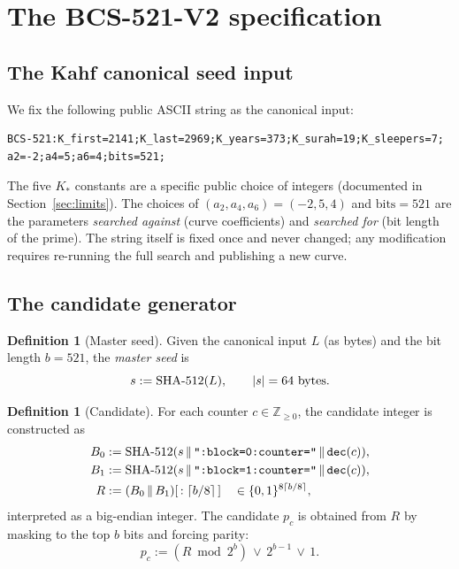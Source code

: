 \documentclass[11pt,a4paper]{article}
\theoremstyle{plain}
\theoremstyle{definition}
\newtheorem{definition}[theorem]{Definition}
\newcommand{\Z}{\mathbb{Z}}
\newcommand{\BCSV}{\textsf{BCS\hbox{-}521\hbox{-}V2}}
\begin{document}
\section{The \BCSV{} specification}
\label{sec:bcs521v2-spec}

\subsection{The Kahf canonical seed input}

We fix the following public ASCII string as the canonical input:
\begin{verbatim}
BCS-521:K_first=2141;K_last=2969;K_years=373;K_surah=19;K_sleepers=7;
a2=-2;a4=5;a6=4;bits=521;
\end{verbatim}
The five $K_*$ constants are a specific public choice of integers
(documented in Section~\ref{sec:limits}). The choices of
$(a_2, a_4, a_6) = (-2, 5, 4)$ and $\text{bits} = 521$ are the
parameters \emph{searched against} (curve coefficients) and \emph{searched for}
(bit length of the prime). The string itself is fixed once and never
changed; any modification requires re-running the full search and
publishing a new curve.

\subsection{The candidate generator}

\begin{definition}[Master seed]
Given the canonical input $L$ (as bytes) and the bit length
$b = 521$, the \emph{master seed} is
\begin{equation*}
  s := \mathrm{SHA{\hbox{-}}512}(L),
  \qquad |s| = 64 \text{ bytes}.
\end{equation*}
\end{definition}

\begin{definition}[Candidate]
For each counter $c \in \Z_{\ge 0}$, the candidate integer is
constructed as
\begin{align*}
  B_0 &:= \mathrm{SHA{\hbox{-}}512}(s \,\|\, \texttt{":block=0:counter="}\,\|\,\texttt{dec}(c)),\\
  B_1 &:= \mathrm{SHA{\hbox{-}}512}(s \,\|\, \texttt{":block=1:counter="}\,\|\,\texttt{dec}(c)),\\
  R   &:= (B_0 \,\|\, B_1)[\,:\lceil b/8\rceil\,] \quad\in \{0,1\}^{8 \lceil b/8\rceil},
\end{align*}
interpreted as a big-endian integer. The candidate $p_c$ is obtained
from $R$ by masking to the top $b$ bits and forcing parity:
\begin{equation*}
  p_c := (R \bmod 2^{b}) \,\vee\, 2^{b-1} \,\vee\, 1.
\end{equation*}
\end{definition}
\end{document}
